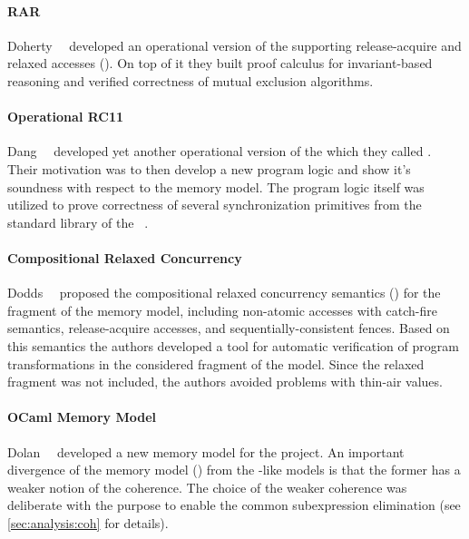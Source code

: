 \paragraph{RAR}

Doherty~\etal~\cite{Doherty-al:PPoPP19} developed an 
operational version of the \RCMM supporting 
release-acquire and relaxed accesses (\RAR). 
On top of it they built proof calculus for 
invariant-based reasoning and verified 
correctness of mutual exclusion algorithms. 

\paragraph{Operational RC11}

Dang~\etal~\cite{Dang-al:POPL19} developed yet another 
operational version of the \RCMM which they called \ORCMM. 
Their motivation was to then develop a 
new program logic and show it's soundness
with respect to the \ORCMM memory model. 
The program logic itself was utilized to 
prove correctness of several synchronization primitives 
from the standard library of the \Rust~\cite{RustBook:19}.

\paragraph{Compositional Relaxed Concurrency}

Dodds~\etal~\cite{Dodds-al:ESOP18} proposed the  
compositional relaxed concurrency semantics (\CRC) 
for the fragment of the \CMM memory model, 
including non-atomic accesses with catch-fire semantics, 
release-acquire accesses, and sequentially-consistent fences. 
Based on this semantics the authors developed 
a tool for automatic verification of program transformations
in the considered fragment of the \CMM model. 
Since the relaxed fragment was not included, 
the authors avoided problems with thin-air values. 

\paragraph{OCaml Memory Model}

Dolan~\etal~\cite{Dolan-al:PLDI18} developed a new 
memory model for the \MOCaml project. 
An important divergence of the \OCaml memory model (\OCMM)
from the \CMM-like models is that the former 
has a weaker notion of the coherence.
The choice of the weaker coherence was deliberate 
with the purpose to enable the common subexpression elimination
(see \cref{sec:analysis:coh} for details).

